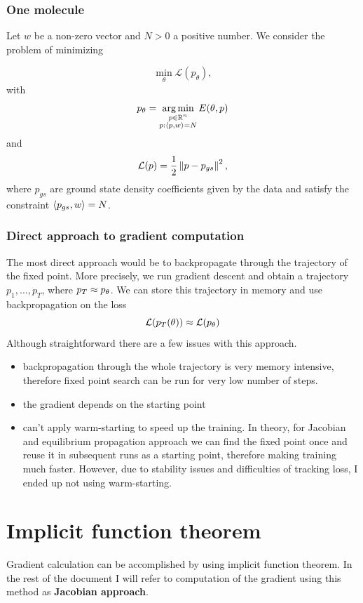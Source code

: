 \documentclass[a4paper,10.5pt]{report}
\begin{document}
\subsubsection{One molecule}
Let $w$ be a non-zero vector and $N>0$ a positive number.
We consider the problem of minimizing

\begin{equation}
 \min_\theta \mathcal{L}(p_\theta),
\end{equation}
with
\begin{equation}
p_\theta = \operatorname*{arg\,min}_{\substack{p \in \mathbb{R}^n \\ p: \langle p, w \rangle=N }} E(\theta, p)
\end{equation}
and
\begin{equation}
 \mathcal{L}(p) = \frac{1}{2} \left\|p-p_{gs}\right\|^2,
\end{equation}
where $p_{gs}$ are ground state density coefficients given by the data and satisfy the constraint $\langle p_{gs}, w \rangle = N$.


\subsubsection{Direct approach to gradient computation}
The most direct approach would be to backpropagate through the trajectory of the fixed point. More precisely, we run gradient descent and obtain a trajectory $p_1, \ldots, p_T$, where $p_T \approx p_\theta$. We can store this trajectory in memory and use backpropagation on the loss
\begin{equation}
 \mathcal{L}(p_T(\theta)) \approx \mathcal{L}(p_\theta)
\end{equation}
Although straightforward there are a few issues with this approach.
\begin{itemize}
 \item backpropagation through the whole trajectory is very memory intensive, therefore fixed point search can be run for very low number of steps.
 \item the gradient depends on the starting point
 \item can't apply warm-starting to speed up the training. In theory, for Jacobian and equilibrium propagation approach we can find the fixed point once and reuse it in subsequent runs as a starting point, therefore making training much faster.
 However, due to stability issues and difficulties of tracking loss, I ended up not using warm-starting.
\end{itemize}


\section{Implicit function theorem}
Gradient calculation can be accomplished by using implicit function theorem. In the rest of the document I will refer to computation of the gradient using this method as \textbf{Jacobian approach}.
\end{document}
